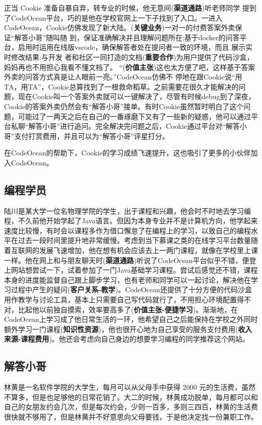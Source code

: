\documentclass[a4paper]{ctexart}
\begin{document}
正当 Cookie 准备自暴自弃，转专业的时候，他无意间(\textbf{渠道通路})听老师同学 提到了CodeOcean平台，巧的是他在学校官网上一下子找到了入口。一进入 CodeOcean，Cookie仿佛发现了新大陆。(\textbf{关键业务})一对一的付费答案外卖保证“解答小哥”随叫随 到，保证准确解决并且理解问题所在;基于docker的问答平台，启用时运用在线版vscode，确保解答者处在提问者一致的环境，而且 展示实时修改结果;与开发 者和社区一同打造的文档(\textbf{重要合作})为用户提供了代码沙盒，妈妈再也不用担心我看不懂文档了。 “(\textbf{价值主张})这也太方便了吧，这样基于答案外卖的问答方式真是让人眼前一亮。”CodeOcean仿佛不 停地在跟Cookie说“用TA，用TA”，Cookie总算找到了一根救命稻草。之前需要花很久才能解决的问题，现在Cookie叫一个答案外卖就可以一键解决了，尽管有时候debug到了深夜，Cookie的答案外卖仍然会有“解答小哥”接单。有时Cookie虽然暂时明白了这个问题，可能过了一两天之后在自己的一番琢磨下又有了一些新的疑惑，他可以通过平台私聊“解答小哥”进行追问。完全解决完问题之后，Cookie通过平台对“解答小哥”支付打赏费用，并且可以为“解答小哥”评星打分。

在CodeOcean的帮助下，Cookie的学习成绩飞速提升，这也吸引了更多的小伙伴加入CodeOcean。

\subsection{编程学员}
陆川是某大学一位名物理学院的学生，出于课程和兴趣，他会时不时地去学习编程，不久前他开始学起了Java语言。但因为本身专业并不是计算机方向，他学起来速度比较慢，有时会以课程多作为借口懈怠了在编程上的学习，以致自己的编程水平在过去一段时间里提升地非常缓慢。考虑到当下慕课之类的在线学习平台数量随着互联网的发展飞速增加，他在想有机会应该去上一两门课程，就像在学校里上课一样。他在网上和与朋友聊天时(\textbf{渠道通路})听说了CodeOcean平台似乎不错，便登上网站想尝试一下，试着参加了一门Java基础学习课程。尝试后感觉还不错，课程本身的进度能监督自己跟上脚步学习，也有老师和同学可以一起讨论，解决他在学习过程中产生的疑问(\textbf{客户关系-教学})。CodeOcean还提供了十分方便的代码沙盒用作教学与讨论工具，基本上只需要自己写代码就行了，不用担心环境配置得不对，比起他以前独自摸索，效率要高多了(\textbf{价值主张-便捷学习})。渐渐地，在CodeOcean上学习成了他日常生活的一环，他希望自己之后能保持在学校之外同时额外学习一门课程(\textbf{知识性资源})，他也很开心地为自己享受的服务支付费用(\textbf{收入来源-课程费用})。他还会考虑向自己身边的想要学习编程的同学推荐这个网站。

\subsection{解答小哥}
林黄是一名软件学院的大学生，每月可以从父母手中获得 2000 元的生活费，虽然不算多，但是也足够他的日常花销了。大二的时候，林黄成功脱单，每月都可以和自己的女朋友约会几次，但是每次约会，少则一百多，多则三四百，林黄的生活费很快就不够用了，但是林黄并不好意思向父母要钱，于是他决定找一份兼职工作。
\end{document}
